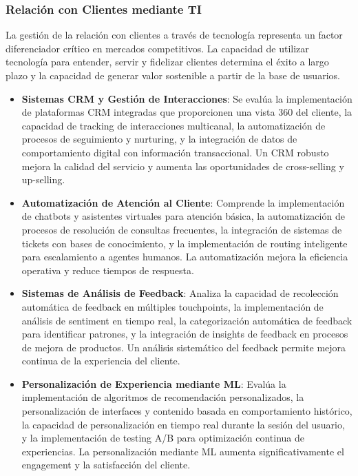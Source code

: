 \subsubsection{Relación con Clientes mediante TI}

La gestión de la relación con clientes a través de tecnología representa un factor diferenciador crítico en mercados competitivos. La capacidad de utilizar tecnología para entender, servir y fidelizar clientes determina el éxito a largo plazo y la capacidad de generar valor sostenible a partir de la base de usuarios.

\begin{itemize}
\item \textbf{Sistemas CRM y Gestión de Interacciones}: Se evalúa la implementación de plataformas CRM integradas que proporcionen una vista 360 del cliente, la capacidad de tracking de interacciones multicanal, la automatización de procesos de seguimiento y nurturing, y la integración de datos de comportamiento digital con información transaccional. Un CRM robusto mejora la calidad del servicio y aumenta las oportunidades de cross-selling y up-selling.

\item \textbf{Automatización de Atención al Cliente}: Comprende la implementación de chatbots y asistentes virtuales para atención básica, la automatización de procesos de resolución de consultas frecuentes, la integración de sistemas de tickets con bases de conocimiento, y la implementación de routing inteligente para escalamiento a agentes humanos. La automatización mejora la eficiencia operativa y reduce tiempos de respuesta.

\item \textbf{Sistemas de Análisis de Feedback}: Analiza la capacidad de recolección automática de feedback en múltiples touchpoints, la implementación de análisis de sentiment en tiempo real, la categorización automática de feedback para identificar patrones, y la integración de insights de feedback en procesos de mejora de productos. Un análisis sistemático del feedback permite mejora continua de la experiencia del cliente.

\item \textbf{Personalización de Experiencia mediante ML}: Evalúa la implementación de algoritmos de recomendación personalizados, la personalización de interfaces y contenido basada en comportamiento histórico, la capacidad de personalización en tiempo real durante la sesión del usuario, y la implementación de testing A/B para optimización continua de experiencias. La personalización mediante ML aumenta significativamente el engagement y la satisfacción del cliente.
\end{itemize}

